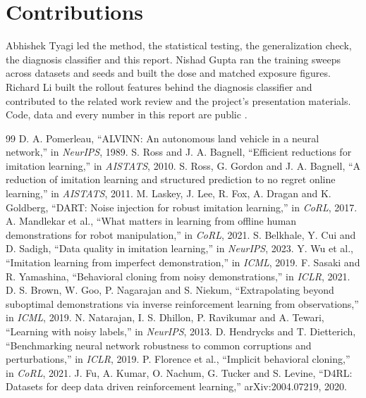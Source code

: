 \documentclass[conference]{IEEEtran}
\begin{document}
\section*{Contributions}
Abhishek Tyagi led the method, the statistical testing, the generalization check, the diagnosis classifier and
this report. Nishad Gupta ran the training sweeps across datasets and seeds and built the dose and matched
exposure figures. Richard Li built the rollout features behind the diagnosis classifier and contributed to the
related work review and the project's presentation materials. Code, data and every number in this report are
public \cite{repo}.

\begin{thebibliography}{99}
 D. A. Pomerleau, ``ALVINN: An autonomous land vehicle in a neural network,'' in \emph{NeurIPS}, 1989.
 S. Ross and J. A. Bagnell, ``Efficient reductions for imitation learning,'' in \emph{AISTATS}, 2010.
 S. Ross, G. Gordon and J. A. Bagnell, ``A reduction of imitation learning and structured prediction to no regret online learning,'' in \emph{AISTATS}, 2011.
 M. Laskey, J. Lee, R. Fox, A. Dragan and K. Goldberg, ``DART: Noise injection for robust imitation learning,'' in \emph{CoRL}, 2017.
 A. Mandlekar et al., ``What matters in learning from offline human demonstrations for robot manipulation,'' in \emph{CoRL}, 2021.
 S. Belkhale, Y. Cui and D. Sadigh, ``Data quality in imitation learning,'' in \emph{NeurIPS}, 2023.
 Y. Wu et al., ``Imitation learning from imperfect demonstration,'' in \emph{ICML}, 2019.
 F. Sasaki and R. Yamashina, ``Behavioral cloning from noisy demonstrations,'' in \emph{ICLR}, 2021.
 D. S. Brown, W. Goo, P. Nagarajan and S. Niekum, ``Extrapolating beyond suboptimal demonstrations via inverse reinforcement learning from observations,'' in \emph{ICML}, 2019.
 N. Natarajan, I. S. Dhillon, P. Ravikumar and A. Tewari, ``Learning with noisy labels,'' in \emph{NeurIPS}, 2013.
 D. Hendrycks and T. Dietterich, ``Benchmarking neural network robustness to common corruptions and perturbations,'' in \emph{ICLR}, 2019.
 P. Florence et al., ``Implicit behavioral cloning,'' in \emph{CoRL}, 2021.
 J. Fu, A. Kumar, O. Nachum, G. Tucker and S. Levine, ``D4RL: Datasets for deep data driven reinforcement learning,'' arXiv:2004.07219, 2020.

\end{thebibliography}
\end{document}
